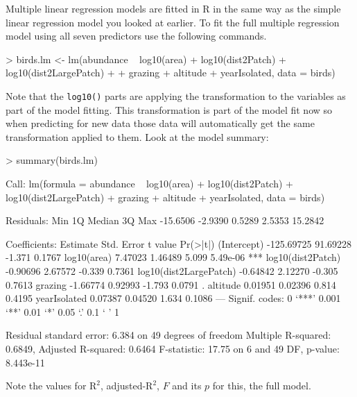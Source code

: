 \documentclass[letterpaper,10pt]{article}
\begin{document}
Multiple linear regression models are fitted in R in the same way as the simple linear regression model you looked at earlier. To fit the full multiple regression model using all seven predictors use the following commands.

\begin{Schunk}
\begin{Sinput}
> birds.lm <- lm(abundance ~ log10(area) + log10(dist2Patch) + log10(dist2LargePatch) +
+                grazing + altitude + yearIsolated, data = birds)
\end{Sinput}
\end{Schunk}

Note that the \texttt{log10()} parts are applying the transformation to the variables as part of the model fitting. This transformation is part of the model fit now so when predicting for new data those data will automatically get the same transformation applied to them. Look at the model summary:

\begin{Schunk}
\begin{Sinput}
> summary(birds.lm)
\end{Sinput}
\begin{Soutput}
Call:
lm(formula = abundance ~ log10(area) + log10(dist2Patch) + log10(dist2LargePatch) + 
    grazing + altitude + yearIsolated, data = birds)

Residuals:
     Min       1Q   Median       3Q      Max 
-15.6506  -2.9390   0.5289   2.5353  15.2842 

Coefficients:
                         Estimate Std. Error t value Pr(>|t|)    
(Intercept)            -125.69725   91.69228  -1.371   0.1767    
log10(area)               7.47023    1.46489   5.099 5.49e-06 ***
log10(dist2Patch)        -0.90696    2.67572  -0.339   0.7361    
log10(dist2LargePatch)   -0.64842    2.12270  -0.305   0.7613    
grazing                  -1.66774    0.92993  -1.793   0.0791 .  
altitude                  0.01951    0.02396   0.814   0.4195    
yearIsolated              0.07387    0.04520   1.634   0.1086    
---
Signif. codes:  0 ‘***’ 0.001 ‘**’ 0.01 ‘*’ 0.05 ‘.’ 0.1 ‘ ’ 1

Residual standard error: 6.384 on 49 degrees of freedom
Multiple R-squared:  0.6849,	Adjusted R-squared:  0.6464 
F-statistic: 17.75 on 6 and 49 DF,  p-value: 8.443e-11
\end{Soutput}
\end{Schunk}

Note the values for $\mathrm{R^2}$, adjusted-$\mathrm{R^2}$, $F$ and its $p$ for this, the full model.
\end{document}
